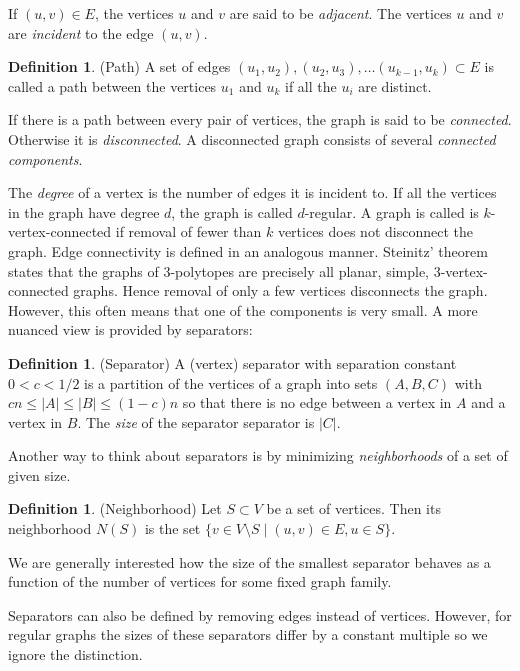 \documentclass[a4paper,12pt]{book}
\theoremstyle{plain}
\theoremstyle{definition}
\newtheorem{definition}[theorem]{Definition}
\begin{document}
If $(u,v) \in E$, the vertices $u$ and $v$ are said to be \textit{adjacent}. 
The vertices $u$ and $v$ are \textit{incident} to the edge $(u,v)$. 
\begin{definition}
 (Path) A set of edges $(u_1, u_2), (u_2, u_3), \dots (u_{k-1}, u_k) \subset E$ 
is called a path between the vertices $u_1$ and $u_k$ if all the $u_i$ are 
distinct.
\end{definition}
If there is a path between every pair of vertices, the graph is said to be 
\textit{connected}. Otherwise it is \textit{disconnected}. A disconnected graph 
consists of several \textit{connected components}.

The \textit{degree} of a vertex is the number of edges it is incident to. 
If all the vertices in the graph have degree $d$, the graph is called 
$d$-regular. A graph is called is $k$-vertex-connected if removal of fewer than 
$k$ vertices does not disconnect the graph. Edge connectivity is defined in an 
analogous manner. Steinitz' theorem states that the graphs of 
3-polytopes are precisely all planar, simple, 3-vertex-connected graphs. Hence 
removal of only a few vertices disconnects the graph. However, this
often means that one of the components is very small. A more nuanced view is 
provided 
by separators:

\begin{definition}
(Separator) A (vertex) separator with separation constant $0<c<1/2$ is a 
partition of the vertices of a graph into 
sets $(A,B,C)$  with $cn \le |A| \le |B| \le (1-c)n$ so that there is no edge between 
a vertex in $A$ and a vertex in $B$. The \textit{size} of the separator
separator is $|C|$.  
\end{definition}

Another way to think about separators is by minimizing \textit{neighborhoods} 
of a set of given size.

\begin{definition}
 (Neighborhood) Let $S \subset V$ be a set of vertices. Then its neighborhood 
$N(S)$ is the set $\{v \in V\setminus S \mid (u,v) \in E, u \in S\}$. 
\end{definition}

We are generally interested how the size of the smallest separator behaves as a 
function 
of the number of vertices for some fixed graph family.

Separators can also be defined by removing edges instead of vertices. However, 
for regular graphs the sizes of these separators differ by a constant multiple 
so we ignore the distinction.
\end{document}
